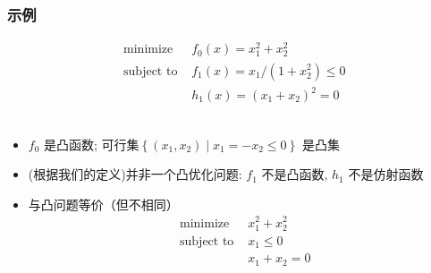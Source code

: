 \documentclass[handout]{beamer}
\begin{document}
	\begin{frame}
		\frametitle{示例}
		
		
		\begin{equation}
			\begin{array}{ll}
				\text{ minimize } & f_{0}(x)=x_{1}^{2}+x_{2}^{2} \\
				\text { subject to } & f_{1}(x)=x_{1} /\left(1+x_{2}^{2}\right) \leq 0 \\
				& h_{1}(x)=\left(x_{1}+x_{2}\right)^{2}=0
			\end{array}
		\end{equation}\\
		\begin{itemize}[<+->]
			\item  $f_{0}$ 是凸函数; 可行集$\left\{\left(x_{1}, x_{2}\right) \mid x_{1}=-x_{2} \leq 0\right\}$ 是凸集
			
			\item (根据我们的定义)并非一个凸优化问题: $f_{1}$ 不是凸函数, $h_{1}$ 不是仿射函数
			
			\item 与凸问题等价（但不相同）
			\begin{equation}
				\begin{array}{ll}
					\text { minimize } & x_{1}^{2}+x_{2}^{2} \\
					\text { subject to } & x_{1} \leq 0 \\
					& x_{1}+x_{2}=0
				\end{array}
			\end{equation}
		\end{itemize}
	\end{frame}
\end{document}
